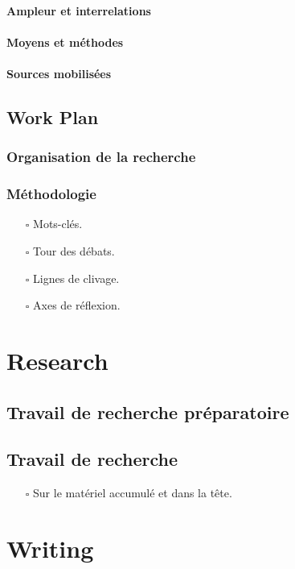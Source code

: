 \documentclass[paper=A4,portrait,twoside=true,twocolumn=false,headinclude=false,footinclude=false,fontsize=11,BCOR=15mm,DIV=calc,pagesize=auto,titlepage=firstiscover,mpinclude=true,headings=normal,headings=twolinechapter,open=right,chapterprefix=false,headsepline=false,parskip=full]{scrbook}
\begin{document}
\subsection{Ampleur et interrelations}
\label{sec:orgc566287}
\subsection{Moyens et méthodes}
\label{sec:org9dd0c9e}
\subsection{Sources mobilisées}
\label{sec:org68499ff}
\chapter{Work Plan}
\label{sec:org68267c7}
\section{Organisation de la recherche}
\label{sec:orga3a97d8}
\section{Méthodologie}
\label{sec:org1fb1190}
\begin{itemize}
\item[{$\square$}] Mots-clés.
\item[{$\square$}] Tour des débats.
\item[{$\square$}] Lignes de clivage.
\item[{$\square$}] Axes de réflexion.
\end{itemize}
\part{Research}
\label{sec:orgd03358e}
\chapter{Travail de recherche préparatoire}
\label{sec:org125fe0a}
\chapter{Travail de recherche}
\label{sec:org869fe1d}
\begin{itemize}
\item[{$\square$}] Sur le matériel accumulé et dans la tête.
\end{itemize}
\part{Writing}
\label{sec:org46c6304}
\end{document}
